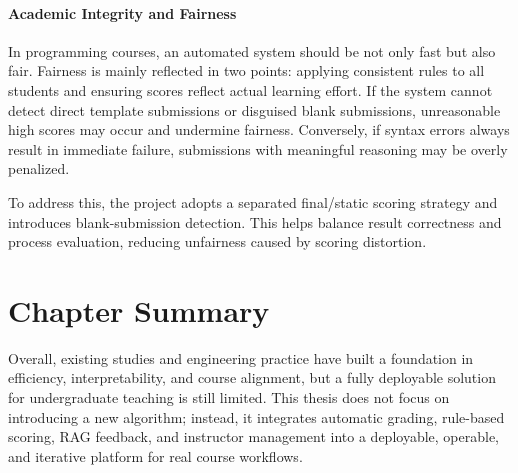 \paragraph{Academic Integrity and Fairness}
In programming courses, an automated system should be not only fast but also fair. Fairness is mainly reflected in two points: applying consistent rules to all students and ensuring scores reflect actual learning effort. If the system cannot detect direct template submissions or disguised blank submissions, unreasonable high scores may occur and undermine fairness. Conversely, if syntax errors always result in immediate failure, submissions with meaningful reasoning may be overly penalized.

To address this, the project adopts a separated final/static scoring strategy and introduces blank-submission detection. This helps balance result correctness and process evaluation, reducing unfairness caused by scoring distortion.

\section{Chapter Summary}

Overall, existing studies and engineering practice have built a foundation in efficiency, interpretability, and course alignment, but a fully deployable solution for undergraduate teaching is still limited. This thesis does not focus on introducing a new algorithm; instead, it integrates automatic grading, rule-based scoring, RAG feedback, and instructor management into a deployable, operable, and iterative platform for real course workflows.

